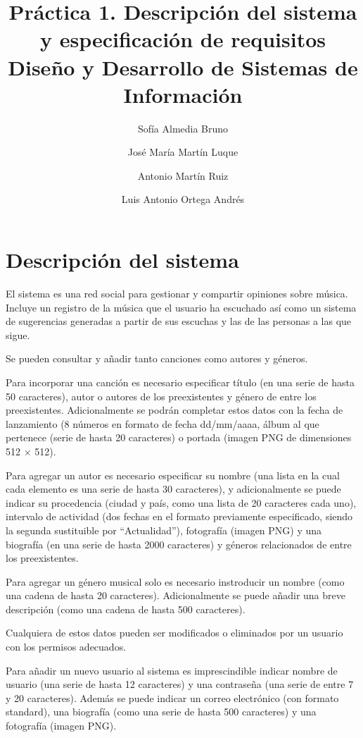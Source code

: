 \documentclass[
  12pt,
  a4paper,
  DIV=12,
  spanish,
]{scrartcl}
\title{Práctica 1. Descripción del sistema y especificación de requisitos \\\large Diseño y Desarrollo de Sistemas de Información}
\author{Sofía Almedia Bruno \and José María Martín Luque \and Antonio Martín Ruiz \and Luis Antonio Ortega Andrés}
\begin{document}
\maketitle

\section{Descripción del sistema} %

El sistema es una red social para gestionar y compartir opiniones sobre música. Incluye un registro de la música que el usuario ha escuchado así como un sistema de sugerencias generadas a partir de sus escuchas y las de las personas a las que sigue.

Se pueden consultar y añadir tanto canciones como autores y géneros. 

Para incorporar una canción es necesario especificar título (en una serie de hasta 50 caracteres), autor o autores de los preexistentes y género de entre los preexistentes. Adicionalmente se podrán completar estos datos con la fecha de lanzamiento (8 números en formato de fecha dd/mm/aaaa, álbum al que pertenece (serie de hasta 20 caracteres) o portada (imagen PNG de dimensiones 512 $\times$ 512).

Para agregar un autor es necesario especificar su nombre (una lista en la cual cada elemento es una serie de hasta 30 caracteres), y adicionalmente se puede indicar su procedencia (ciudad y país, como una lista de 20 caracteres cada uno), intervalo de actividad (dos fechas en el formato previamente especificado, siendo la segunda sustituible por ``Actualidad''), fotografía (imagen PNG) y una biografía (en una serie de hasta 2000 caracteres) y géneros relacionados de entre los preexistentes.

Para agregar un género musical solo es necesario instroducir un nombre (como una cadena de hasta 20 caracteres). Adicionalmente se puede añadir una breve descripción (como una cadena de hasta 500 caracteres).

Cualquiera de estos datos pueden ser modificados o eliminados por un usuario con los permisos adecuados.


Para añadir un nuevo usuario al sistema es imprescindible indicar nombre de usuario (una serie de hasta 12 caracteres) y una contraseña (una serie de entre 7 y 20 caracteres). Además se puede indicar un correo electrónico (con formato standard), una biografía (como una serie de hasta 500 caracteres) y una fotografía (imagen PNG). 
\end{document}
